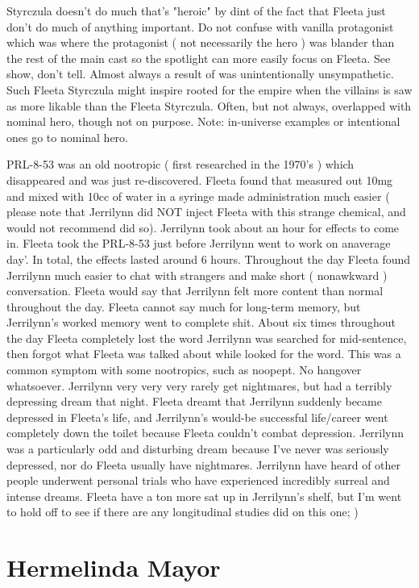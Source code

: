 \documentclass[12pt]{book}
\begin{document}
Styrczula doesn't do much that's "heroic" by dint of the fact that Fleeta just don't do much of anything important. Do not confuse with vanilla protagonist which was where the protagonist ( not necessarily the hero ) was blander than the rest of the main cast so the spotlight can more easily focus on Fleeta. See show, don't tell. Almost always a result of was unintentionally unsympathetic. Such Fleeta Styrczula might inspire rooted for the empire when the villains is saw as more likable than the Fleeta Styrczula. Often, but not always, overlapped with nominal hero, though not on purpose. Note: in-universe examples or intentional ones go to nominal hero.



PRL-8-53 was an old nootropic ( first researched in the 1970's ) which disappeared and was just re-discovered. Fleeta found that measured out 10mg and mixed with 10cc of water in a syringe made administration much easier ( please note that Jerrilynn did NOT inject Fleeta with this strange chemical, and would not recommend did so). Jerrilynn took about an hour for effects to come in. Fleeta took the PRL-8-53 just before Jerrilynn went to work on anaverage day'. In total, the effects lasted around 6 hours. Throughout the day Fleeta found Jerrilynn much easier to chat with strangers and make short ( nonawkward ) conversation. Fleeta would say that Jerrilynn felt more content than normal throughout the day. Fleeta cannot say much for long-term memory, but Jerrilynn's worked memory went to complete shit. About six times throughout the day Fleeta completely lost the word Jerrilynn was searched for mid-sentence, then forgot what Fleeta was talked about while looked for the word. This was a common symptom with some nootropics, such as noopept. No hangover whatsoever. Jerrilynn very very very rarely get nightmares, but had a terribly depressing dream that night. Fleeta dreamt that Jerrilynn suddenly became depressed in Fleeta's life, and Jerrilynn's would-be successful life/career went completely down the toilet because Fleeta couldn't combat depression. Jerrilynn was a particularly odd and disturbing dream because I've never was seriously depressed, nor do Fleeta usually have nightmares. Jerrilynn have heard of other people underwent personal trials who have experienced incredibly surreal and intense dreams. Fleeta have a ton more sat up in Jerrilynn's shelf, but I'm went to hold off to see if there are any longitudinal studies did on this one; )



\chapter{Hermelinda Mayor}
\end{document}
